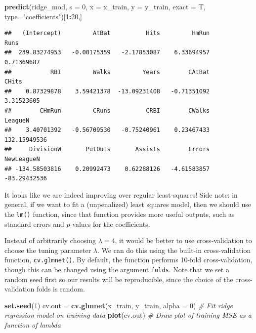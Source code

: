 \documentclass[
  openany]{book}
\newenvironment{Shaded}{\begin{snugshade}}{\end{snugshade}}
\newcommand{\CommentTok}[1]{\textcolor[rgb]{0.56,0.35,0.01}{\textit{#1}}}
\newcommand{\DataTypeTok}[1]{\textcolor[rgb]{0.13,0.29,0.53}{#1}}
\newcommand{\DecValTok}[1]{\textcolor[rgb]{0.00,0.00,0.81}{#1}}
\newcommand{\KeywordTok}[1]{\textcolor[rgb]{0.13,0.29,0.53}{\textbf{#1}}}
\newcommand{\NormalTok}[1]{#1}
\newcommand{\OperatorTok}[1]{\textcolor[rgb]{0.81,0.36,0.00}{\textbf{#1}}}
\newcommand{\StringTok}[1]{\textcolor[rgb]{0.31,0.60,0.02}{#1}}
\begin{document}
\begin{Shaded}
\begin{Highlighting}[]
\KeywordTok{predict}\NormalTok{(ridge_mod, }\DataTypeTok{s =} \DecValTok{0}\NormalTok{, }\DataTypeTok{x =}\NormalTok{ x_train, }\DataTypeTok{y =}\NormalTok{ y_train, }\DataTypeTok{exact =}\NormalTok{ T, }\DataTypeTok{type=}\StringTok{"coefficients"}\NormalTok{)[}\DecValTok{1}\OperatorTok{:}\DecValTok{20}\NormalTok{,]}
\end{Highlighting}
\end{Shaded}

\begin{verbatim}
##   (Intercept)         AtBat          Hits         HmRun          Runs 
##  239.83274953   -0.00175359   -2.17853087    6.33694957    0.71369687 
##           RBI         Walks         Years        CAtBat         CHits 
##    0.87329878    3.59421378  -13.09231408   -0.71351092    3.31523605 
##        CHmRun         CRuns          CRBI        CWalks       LeagueN 
##    3.40701392   -0.56709530   -0.75240961    0.23467433  132.15949536 
##     DivisionW       PutOuts       Assists        Errors    NewLeagueN 
## -134.58503816    0.20992473    0.62288126   -4.61583857  -83.29432536
\end{verbatim}

It looks like we are indeed improving over regular least-squares! Side note: in general, if we want to fit a (unpenalized) least squares model, then
we should use the \texttt{lm()} function, since that function provides more useful
outputs, such as standard errors and \(p\)-values for the coefficients.

Instead of arbitrarily choosing \(\lambda = 4\), it would be better to
use cross-validation to choose the tuning parameter \(\lambda\). We can do this using
the built-in cross-validation function, \texttt{cv.glmnet()}. By default, the function
performs 10-fold cross-validation, though this can be changed using the
argument \texttt{folds}. Note that we set a random seed first so our results will be
reproducible, since the choice of the cross-validation folds is random.

\begin{Shaded}
\begin{Highlighting}[]
\KeywordTok{set.seed}\NormalTok{(}\DecValTok{1}\NormalTok{)}
\NormalTok{cv.out =}\StringTok{ }\KeywordTok{cv.glmnet}\NormalTok{(x_train, y_train, }\DataTypeTok{alpha =} \DecValTok{0}\NormalTok{) }\CommentTok{# Fit ridge regression model on training data}
\KeywordTok{plot}\NormalTok{(cv.out) }\CommentTok{# Draw plot of training MSE as a function of lambda}
\end{Highlighting}
\end{Shaded}
\end{document}

